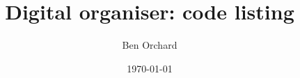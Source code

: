 

\usepackage{underscore}



\title{Digital organiser: code listing}
\author{Ben Orchard}

\date{\today}

\maketitle

\clearpage
\tableofcontents
\clearpage




